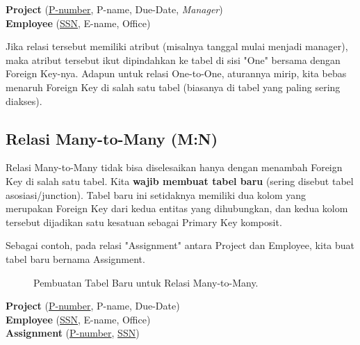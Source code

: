 \documentclass[11pt,a4paper]{article}
\begin{document}
\begin{skema}
	\textbf{Project} (\underline{P-number}, P-name, Due-Date, \textit{Manager}) \\
	\textbf{Employee} (\underline{SSN}, E-name, Office)
\end{skema}

Jika relasi tersebut memiliki atribut (misalnya tanggal mulai menjadi manager), maka atribut tersebut ikut dipindahkan ke tabel di sisi "One" bersama dengan Foreign Key-nya. Adapun untuk relasi One-to-One, aturannya mirip, kita bebas menaruh Foreign Key di salah satu tabel (biasanya di tabel yang paling sering diakses).

\subsection{Relasi Many-to-Many (M:N)}
Relasi Many-to-Many tidak bisa diselesaikan hanya dengan menambah Foreign Key di salah satu tabel. Kita \textbf{wajib membuat tabel baru} (sering disebut tabel asosiasi/junction). Tabel baru ini setidaknya memiliki dua kolom yang merupakan Foreign Key dari kedua entitas yang dihubungkan, dan kedua kolom tersebut dijadikan satu kesatuan sebagai Primary Key komposit.

Sebagai contoh, pada relasi "Assignment" antara Project dan Employee, kita buat tabel baru bernama Assignment.

\begin{figure}[H]
	\centering
	\caption{Pembuatan Tabel Baru untuk Relasi Many-to-Many.}
	\label{fig:many_to_many}
\end{figure}

\begin{skema}
	\textbf{Project} (\underline{P-number}, P-name, Due-Date) \\
	\textbf{Employee} (\underline{SSN}, E-name, Office) \\
	\textbf{Assignment} (\underline{P-number}, \underline{SSN})
\end{skema}
\end{document}
